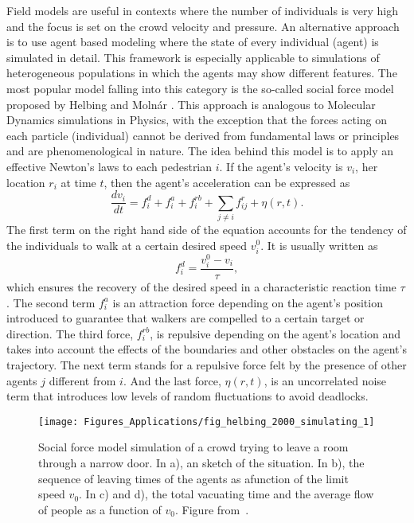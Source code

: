 Field models are useful in contexts where the number of individuals is very high and the focus is set on the crowd velocity and pressure. An alternative approach is to use agent based modeling where the state of every individual (agent) is simulated in detail. This framework is especially applicable to simulations of heterogeneous populations in which the agents may show different features. 
The most popular model falling into this category is the so-called social force model proposed by Helbing and Moln\'ar \cite{helbing_1995_social, helbing_2001_self}. 
This approach is analogous to Molecular Dynamics simulations in Physics, with the exception that the forces acting on each particle (individual) cannot be derived from fundamental laws or principles and are phenomenological in nature. 
The idea behind this model is to apply an effective Newton's laws to each pedestrian $i$. If the agent's velocity is $v_i$, her location $r_i$ at time $t$, then the agent's acceleration can be expressed as
\begin{equation}   
\label{eq:ped:sfm}  
\frac{d v_i}{dt} = f_i^d + f_i^a + f_i^{rb} + \sum_{j \ne i} f_{ij}^r + \eta(r,t) .
\end{equation}
The first term on the right hand side of the equation accounts for the tendency of the individuals to walk at a certain desired speed $v_i^0$. It is usually written as 
\begin{equation}   
\label{eq:ped:des}  
f_i^d = \frac{v_i^0-v_i}{\tau} ,
\end{equation}     
which ensures the recovery of the desired speed in a characteristic reaction time $\tau$. The second term $f_i^a$ is an attraction force depending on the agent's position introduced to guarantee that walkers are compelled to a certain target or direction. The third force, $f_i^{rb}$, is repulsive depending on the agent's location and takes into account the effects of the boundaries and other obstacles on the agent's trajectory. The next term stands for a repulsive force felt by the presence of other agents $j$ different from $i$. And the last force, $\eta(r,t)$, is an uncorrelated noise term that introduces low levels of random fluctuations to avoid deadlocks.

\begin{figure}
\centering
\texttt{[image: Figures\_Applications/fig\_helbing\_2000\_simulating\_1]}
\caption{Social force model simulation of a crowd trying to leave a room through a narrow door. In a), an sketch of the situation. In b), the sequence of leaving times of the agents as afunction of the limit speed $v_0$. In c) and d), the total vacuating time and the average flow of people as a function of $v_0$. Figure from~\cite{helbing_2000_simulating}. \label{fig:helbing_2000_simulating_1}}
\end{figure}


